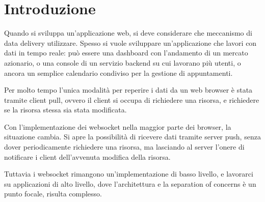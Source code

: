 \documentclass[12pt,a4paper,openright]{report}
\newcommand\blankpage{%
    \null
    \thispagestyle{empty}%
    \addtocounter{page}{-1}%
    \newpage}
\begin{document}
  \afterpage{\blankpage}

\normalsize
\clearpage{\pagestyle{empty}\cleardoublepage}
\tableofcontents
\rhead[\fancyplain{}{\bfseries\leftmark}]{\fancyplain{}{\bfseries\thepage}}

\listoffigures
{}




\chapter*{Introduzione}
Quando si sviluppa un’applicazione web, si deve considerare che meccanismo di data delivery utilizzare. Spesso si vuole sviluppare un’applicazione che lavori con dati in tempo reale: può essere una dashboard con l’andamento di un mercato azionario, o una console di un servizio backend su cui lavorano più utenti, o ancora un semplice calendario condiviso per la gestione di appuntamenti.

\bigskip

Per molto tempo l’unica modalità per reperire i dati da un web browser è stata tramite client pull, ovvero il client si occupa di richiedere una risorsa, e richiedere se la risorsa stessa sia stata modificata.

\bigskip

Con l’implementazione dei websocket nella maggior parte dei browser, la situazione cambia. Si apre la possibilità di ricevere dati tramite server push, senza dover periodicamente richiedere una risorsa, ma lasciando al server l’onere di notificare i client dell’avvenuta modifica della risorsa.

\bigskip

Tuttavia i websocket rimangono un’implementazione di basso livello, e lavorarci su applicazioni di alto livello, dove l’architettura e la separation of concerns è un punto focale, risulta complesso.
\end{document}
